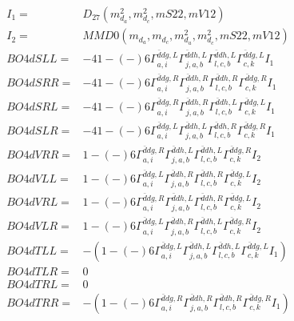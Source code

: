 \documentclass[A4,landscape]{article}
\begin{document}
\begin{align} 
I_1 = & D_{27}(m^2_{d_{{a}}}, m^2_{d_{{c}}}, mS22, mV12) \\ 
I_2 = & MMD0(m_{d_{{a}}}, m_{d_{{c}}}, m^2_{d_{{a}}}, m^2_{d_{{c}}}, mS22, mV12) \\ 
  BO4dSLL= & -4   1
-(-)
  6 \Gamma^{\bar{d}d g ,L}_{a, i} \Gamma^{\bar{d}d h ,L}_{j, a, b} \Gamma^{\bar{d}d h ,L}_{l, c, b} \Gamma^{\bar{d}d g ,L}_{c, k} I_1 \\ 
  BO4dSRR= & -4   1
-(-)
  6 \Gamma^{\bar{d}d g ,R}_{a, i} \Gamma^{\bar{d}d h ,R}_{j, a, b} \Gamma^{\bar{d}d h ,R}_{l, c, b} \Gamma^{\bar{d}d g ,R}_{c, k} I_1 \\ 
  BO4dSRL= & -4   1
-(-)
  6 \Gamma^{\bar{d}d g ,R}_{a, i} \Gamma^{\bar{d}d h ,R}_{j, a, b} \Gamma^{\bar{d}d h ,L}_{l, c, b} \Gamma^{\bar{d}d g ,L}_{c, k} I_1 \\ 
  BO4dSLR= & -4   1
-(-)
  6 \Gamma^{\bar{d}d g ,L}_{a, i} \Gamma^{\bar{d}d h ,L}_{j, a, b} \Gamma^{\bar{d}d h ,R}_{l, c, b} \Gamma^{\bar{d}d g ,R}_{c, k} I_1 \\ 
  BO4dVRR= &   1
-(-)
  6 \Gamma^{\bar{d}d g ,R}_{a, i} \Gamma^{\bar{d}d h ,L}_{j, a, b} \Gamma^{\bar{d}d h ,L}_{l, c, b} \Gamma^{\bar{d}d g ,R}_{c, k} I_2 \\ 
  BO4dVLL= &   1
-(-)
  6 \Gamma^{\bar{d}d g ,L}_{a, i} \Gamma^{\bar{d}d h ,R}_{j, a, b} \Gamma^{\bar{d}d h ,R}_{l, c, b} \Gamma^{\bar{d}d g ,L}_{c, k} I_2 \\ 
  BO4dVRL= &   1
-(-)
  6 \Gamma^{\bar{d}d g ,R}_{a, i} \Gamma^{\bar{d}d h ,L}_{j, a, b} \Gamma^{\bar{d}d h ,R}_{l, c, b} \Gamma^{\bar{d}d g ,L}_{c, k} I_2 \\ 
  BO4dVLR= &   1
-(-)
  6 \Gamma^{\bar{d}d g ,L}_{a, i} \Gamma^{\bar{d}d h ,R}_{j, a, b} \Gamma^{\bar{d}d h ,L}_{l, c, b} \Gamma^{\bar{d}d g ,R}_{c, k} I_2 \\ 
  BO4dTLL= & -(  1
-(-)
  6 \Gamma^{\bar{d}d g ,L}_{a, i} \Gamma^{\bar{d}d h ,L}_{j, a, b} \Gamma^{\bar{d}d h ,L}_{l, c, b} \Gamma^{\bar{d}d g ,L}_{c, k} I_1) \\ 
  BO4dTLR= & 0 \\ 
  BO4dTRL= & 0 \\ 
  BO4dTRR= & -(  1
-(-)
  6 \Gamma^{\bar{d}d g ,R}_{a, i} \Gamma^{\bar{d}d h ,R}_{j, a, b} \Gamma^{\bar{d}d h ,R}_{l, c, b} \Gamma^{\bar{d}d g ,R}_{c, k} I_1) \\ 
\end{align} 
\end{document}

